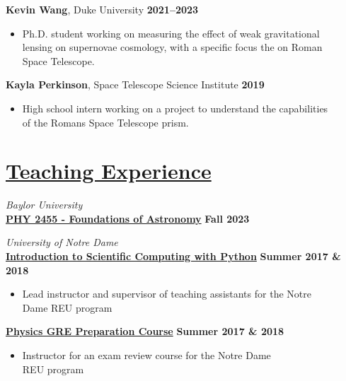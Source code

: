 \documentclass[margin]{res}
\begin{document}
\begin{resume}
\textbf{Kevin Wang}, Duke University \hfill \textbf{2021--2023}
\begin{itemize}\itemsep -2pt
    \item[] Ph.D. student working on measuring the effect of weak gravitational\\lensing on supernovae cosmology, with a specific focus the on Roman\\Space Telescope.
    \end{itemize}
    \vspace{-12pt}
\textbf{Kayla Perkinson}, Space Telescope Science Institute \hfill \textbf{2019}
    \begin{itemize}\itemsep -2pt
    \item[] High school intern working on a project to understand the capabilities\\of the Romans Space Telescope prism.
    \end{itemize}

    


\section{\href{https://www3.nd.edu/~brose3/\#classes}{Teaching Experience}}\label{teaching}
\hspace{-1em}\textit{Baylor University}\vspace{0.25em}\\
\textbf{\href{}{PHY 2455 - Foundations of Astronomy}} \hfill{} \textbf{Fall 2023}

\newpage
\hspace{-1em}\textit{University of Notre Dame}\vspace{0.25em}\\
\textbf{\href{https://www3.nd.edu/~brose3/2017reu-cmp}{Introduction to Scientific Computing with Python}} \hfill{} \textbf{Summer 2017 \& 2018}
\begin{itemize}\itemsep -2pt
    \item[] Lead instructor and supervisor of teaching assistants for the Notre \\Dame REU program
    \end{itemize} \vspace{-12pt}
\textbf{\href{https://www3.nd.edu/~brose3/2017reu-gre}{Physics GRE Preparation Course}} \hfill{} \textbf{Summer 2017 \& 2018}
\begin{itemize}\itemsep -2pt
    \item[] Instructor for an exam review course for the Notre Dame\\REU program
    \end{itemize} \vspace{-12pt}


\end{resume}
\end{document}
